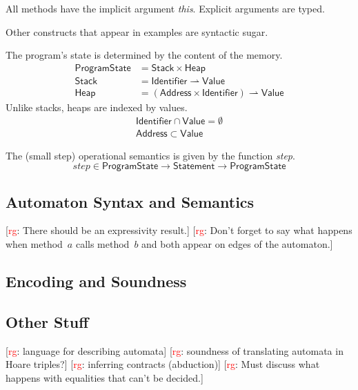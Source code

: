 \documentclass[a4paper]{article}
\newcommand{\todo}[2]{{\small [\textcolor{red}{#1}: #2]}}
\newcommand{\rg}[1]{\todo{rg}{#1}}
\newcommand{\pmap}{\rightharpoonup}
\theoremstyle{remark}
\begin{document}
\noindent All methods have the implicit argument \textit{this}.
Explicit arguments are typed.


\noindent Other constructs that appear in examples are syntactic sugar.

The program's state is determined by the content of the memory.
\begin{align}
\mathsf{ProgramState}&=\mathsf{Stack}\times\mathsf{Heap} \\
\mathsf{Stack}&=\mathsf{Identifier}\pmap\mathsf{Value} \\
\mathsf{Heap}&=(\mathsf{Address}\times\mathsf{Identifier})\pmap\mathsf{Value}
\end{align}
Unlike stacks, heaps are indexed by values.
\begin{gather}
\mathsf{Identifier}\cap\mathsf{Value}=\emptyset \\
\mathsf{Address}\subset\mathsf{Value}
\end{gather}

The (small step) operational semantics is given by the function \textit{step}.
\begin{equation}
\mathit{step}\in \mathsf{ProgramState}\to \mathsf{Statement} \to \mathsf{ProgramState}
\end{equation}

\subsection{Automaton Syntax and Semantics} %

\rg{There should be an expressivity result.}
\rg{Don't forget to say what happens when method~$a$ calls method~$b$ and both appear on edges of the automaton.}

\subsection{Encoding and Soundness} %

\subsection{Other Stuff} %

\rg{language for describing automata}
\rg{soundness of translating automata in Hoare triples?}
\rg{inferring contracts (abduction)}
\rg{Must discuss what happens with equalities that can't be decided.}
\end{document}
